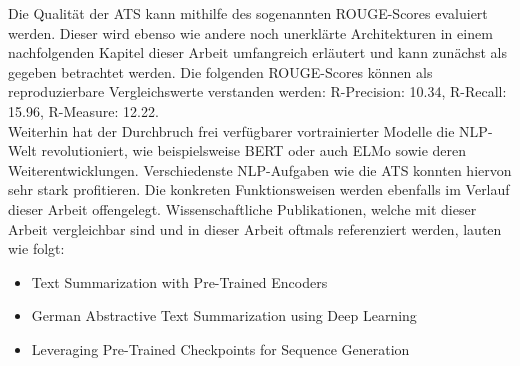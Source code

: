 \noindent
Die Qualität der \ac{ATS} kann mithilfe des sogenannten ROUGE-Scores evaluiert werden. Dieser wird ebenso wie andere noch unerklärte Architekturen in einem nachfolgenden Kapitel dieser Arbeit umfangreich erläutert und kann zunächst als gegeben betrachtet werden. Die folgenden ROUGE-Scores können als reproduzierbare Vergleichswerte verstanden werden: R-Precision: 10.34, R-Recall: 15.96, R-Measure: 12.22.\\

\noindent
Weiterhin hat der Durchbruch frei verfügbarer vortrainierter Modelle die \ac{NLP}-Welt revolutioniert, wie beispielsweise \ac{BERT} \cite{DEV19} oder auch \ac{ELMo} \cite{PET18} sowie deren Weiterentwicklungen. Verschiedenste \ac{NLP}-Aufgaben wie die \ac{ATS} konnten hiervon sehr stark profitieren. Die konkreten Funktionsweisen werden ebenfalls im Verlauf dieser Arbeit offengelegt. Wissenschaftliche Publikationen, welche mit dieser Arbeit vergleichbar sind und in dieser Arbeit oftmals referenziert werden, lauten wie folgt:

\begin{itemize}
	\item Text Summarization with Pre-Trained Encoders \cite{YAN19}
	\item German Abstractive Text Summarization using Deep Learning \cite{NIT19}
	\item Leveraging Pre-Trained Checkpoints for Sequence Generation \cite{ROT20}
\end{itemize}
